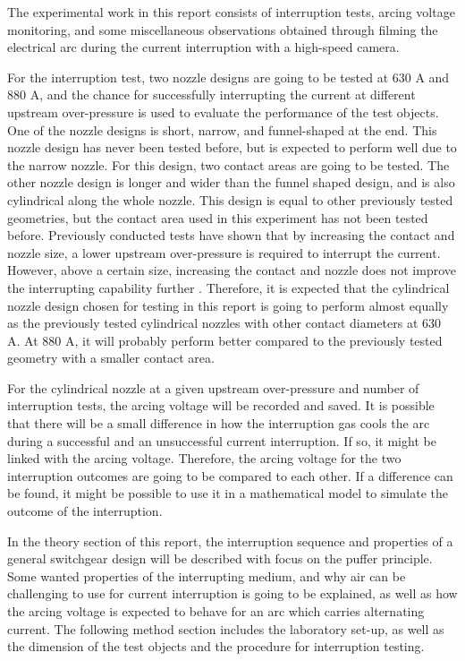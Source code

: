 \documentclass[10pt,b5paper,twoside]{article}
\begin{document}
The experimental work in this report consists of interruption tests, arcing voltage monitoring, and some miscellaneous observations obtained through filming the electrical arc during the current interruption with a high-speed camera.

For the interruption test, two nozzle designs are going to be tested at 630 A and 880 A, and the chance for successfully interrupting the current at different upstream over-pressure is used to evaluate the performance of the test objects. One of the nozzle designs is short, narrow, and funnel-shaped at the end. This nozzle design has never been tested before, but is expected to perform well due to the narrow nozzle. For this design, two contact areas are going to be tested. The other nozzle design is longer and wider than the funnel shaped design, and is also cylindrical along the whole nozzle. This design is equal to other previously tested geometries, but the contact area used in this experiment has not been tested before. Previously conducted tests have shown that by increasing the contact and nozzle size, a lower upstream over-pressure is required to interrupt the current. However, above a certain size, increasing the contact and nozzle does not improve the interrupting capability further \cite{bib:AFIMVLBA}. Therefore, it is expected that the cylindrical nozzle design chosen for testing in this report is going to perform almost equally as the previously tested cylindrical nozzles with other contact diameters at 630 A. At 880 A, it will probably perform better compared to the previously tested geometry with a smaller contact area.

For the cylindrical nozzle at a given upstream over-pressure and number of interruption tests, the arcing voltage will be recorded and saved. It is possible that there will be a small difference in how the interruption gas cools the arc during a successful and an unsuccessful current interruption. If so, it might be linked with the arcing voltage. Therefore, the arcing voltage for the two interruption outcomes are going to be compared to each other. If a difference can be found, it might be possible to use it in a mathematical model to simulate the outcome of the interruption.

In the theory section of this report, the interruption sequence and properties of a general switchgear design will be described with focus on the puffer principle. Some wanted properties of the interrupting medium, and why air can be challenging to use for current interruption is going to be explained, as well as how the arcing voltage is expected to behave for an arc which carries alternating current. The following method section includes the laboratory set-up, as well as the dimension of the test objects and the procedure for interruption testing.
\end{document}
